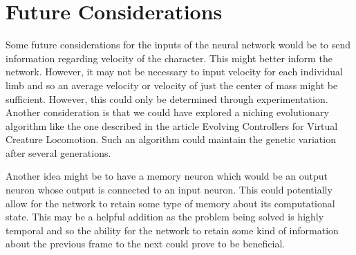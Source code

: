 \documentclass[letterpaper]{article} %
\begin{document}
\section{Future Considerations}

Some future considerations for the inputs of the neural network would be to send information regarding velocity of the character. This might better inform the network. However, it may not be necessary to input velocity for each individual limb and so an average velocity or velocity of just the center of mass might be sufficient. However, this could only be determined through experimentation. Another consideration is that we could have explored a niching evolutionary algorithm like the one described in the article Evolving Controllers for Virtual Creature Locomotion. Such an algorithm could maintain the genetic variation after several generations\cite{sanders_lobb_riddle_2003}.  

\par Another idea might be to have a memory neuron which would be an output neuron whose output is connected to an input neuron. This could potentially allow for the network to retain some type of memory about its computational state. This may be a helpful addition as the problem being solved is highly temporal and so the ability for the network to retain some kind of information about the previous frame to the next could prove to be beneficial.


\end{document}
